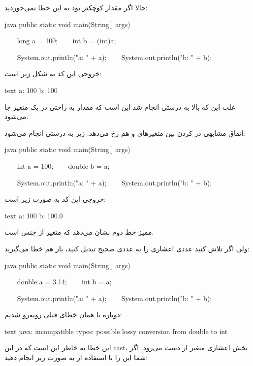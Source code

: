 حالا اگر مقدار  کوچکتر بود به این خطا نمی‌خوردید:

\begin{codebox}{java}
public static void main(String[] args) {
    long a = 100;
    int b = (int)a;  
  
    System.out.println("a: " + a);  
    System.out.println("b: " + b);  
}
\end{codebox}

خروجی این کد به شکل زیر است:

\begin{codebox}{text}
a: 100  
b: 100
\end{codebox}

علت این که  بالا به درستی انجام شد این است که مقدار
 به راحتی در یک متغیر  جا می‌شود.

اتفاق مشابهی در  کردن بین متغیرهای  و
 هم رخ می‌دهد.  زیر به درستی انجام می‌شود:

\begin{codebox}{java}
public static void main(String[] args) {
    int a = 100;
    double b = a;  
  
    System.out.println("a: " + a);  
    System.out.println("b: " + b);  
}
\end{codebox}

خروجی این کد به صورت زیر است:

\begin{codebox}{text}
a: 100  
b: 100.0
\end{codebox}

ممیز خط دوم نشان می‌دهد که متغیر  از جنس
 است.

ولی اگر تلاش کنید عددی اعشاری را به عددی صحیح تبدیل کنید، باز هم خطا
می‌گیرید:

\begin{codebox}{java}
public static void main(String[] args) {
    double a = 3.14;
    int b = a;  
  
    System.out.println("a: " + a);  
    System.out.println("b: " + b);  
}
\end{codebox}

دوباره با همان خطای قبلی روبه‌رو شدیم:

\begin{codebox}{text}
java: incompatible types: possible lossy conversion from double to int
\end{codebox}

این خطا به خاطر این است که در این cast، بخش اعشاری متغیر 
از دست می‌رود. اگر شما این  را با استفاده از 
به صورت زیر انجام دهید:

